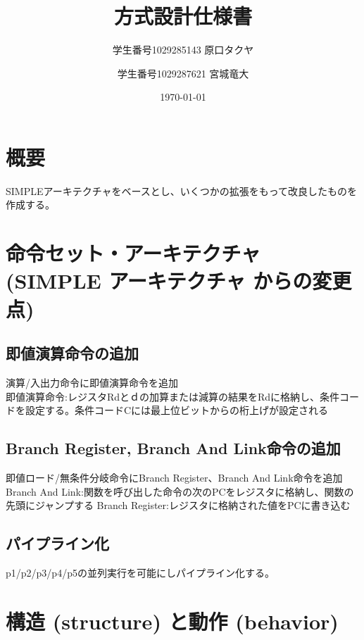 \documentclass{jsreport}
\title{方式設計仕様書}
\author{学生番号1029285143 原口タクヤ \and 学生番号1029287621 宮城竜大}
\date{\today}
\begin{document}
\maketitle
\clearpage

\section{概要}
   	SIMPLEアーキテクチャをベースとし、いくつかの拡張をもって改良したものを作成する。\\  

\section{命令セット・アーキテクチャ (SIMPLE アーキテクチャ からの変更点)}
	\subsection{即値演算命令の追加}
		演算/入出力命令に即値演算命令を追加\\
        即値演算命令:レジスタRdとｄの加算または減算の結果をRdに格納し、条件コードを設定する。条件コードCには最上位ビットからの桁上げが設定される
	
    \subsection{Branch Register, Branch And Link命令の追加}
		即値ロード/無条件分岐命令にBranch Register、Branch And Link命令を追加\\
        Branch And Link:関数を呼び出した命令の次のPCをレジスタに格納し、関数の先頭にジャンプする
        Branch Register:レジスタに格納された値をPCに書き込む
    
    \subsection{パイプライン化}
    	p1/p2/p3/p4/p5の並列実行を可能にしパイプライン化する。
        
\section{構造 (structure) と動作 (behavior)}
\end{document}
